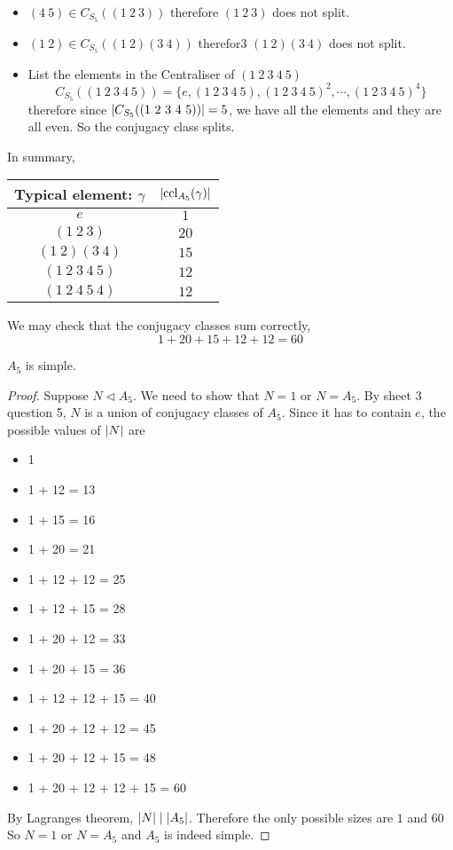 \documentclass{article}
\begin{document}
\begin{eg}[Conjugacy in $A_n$]\leavevmode
    \begin{itemize}
        \item $(4\ 5) \in C_{S_5}((1\ 2\ 3))$ therefore $(1\ 2\ 3)$ does not split.
        \item $(1\ 2) \in C_{S_5}((1\ 2)(3\ 4))$ therefor3 $(1\ 2)(3\ 4)$ does not split.
        \item List the elements in the Centraliser of $(1\ 2\ 3\ 4\ 5)$
        \[
            C_{S_5}((1\ 2\ 3\ 4\ 5)) = \{e, (1\ 2\ 3\ 4\ 5), (1\ 2\ 3\ 4\ 5)^2, \cdots, (1\ 2\ 3\ 4\ 5)^4\}
        \]
        therefore since $\abs{C_{S_5}((1\ 2\ 3\ 4\ 5))} = 5$, we have all the elements and they are all even.
        So the conjugacy class splits.
    \end{itemize}
    In summary,
    \begin{center}
    \begin{tabular}{c | c}
        Typical element: $\gamma$ & $\left\lvert \operatorname{ccl}_{A_5}(\gamma)\right\rvert$ \\
        \hline
        $e$ & $1$ \\
        $(1\ 2\ 3)$ & $20$ \\
        $(1\ 2)(3\ 4)$ & $15$ \\
        $(1\ 2\ 3\ 4\ 5)$ & $12$ \\
        $(1\ 2\ 4\ 5\ 4)$ & $12$
    \end{tabular}
    \end{center}
    We may check that the conjugacy classes sum correctly,
    \[
        1 + 20 + 15 + 12 + 12 = 60  
    \]
\end{eg}

\begin{thm}[$A_5$ is simple]
    $A_5$ is simple.
\end{thm}
\begin{proof}
    Suppose $N \triangleleft A_5$. We need to show that $N = 1$ or $N = A_5$. 
    By sheet 3 question 5, $N$ is a union of conjugacy classes of $A_5$. Since it has to contain $e$, the possible values of $\left\lvert N\right\rvert$ are
    \begin{itemize}
        \item 1
        \item 1 + 12 = 13
        \item 1 + 15 = 16
        \item 1 + 20 = 21
        \item 1 + 12 + 12 = 25
        \item 1 + 12 + 15 = 28
        \item 1 + 20 + 12 = 33
        \item 1 + 20 + 15 = 36
        \item 1 + 12 + 12 + 15 = 40 
        \item 1 + 20 + 12 + 12 = 45
        \item 1 + 20 + 12 + 15 = 48
        \item 1 + 20 + 12 + 12 + 15 = 60
    \end{itemize}
    By Lagranges theorem, $\left\lvert N\right\rvert \mid \left\lvert A_5\right\rvert$. Therefore the only possible sizes are $1$ and $60$
    So $N = 1$ or $N = A_5$ and $A_5$ is indeed simple.
\end{proof}
\end{document}
